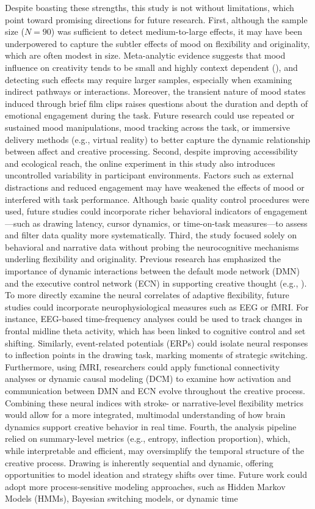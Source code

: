 \documentclass[../MA_Thesis.tex]{subfiles}
\begin{document}
Despite boasting these strengths, this study is not without limitations, which point toward promising directions for future research. First, although the sample size ($N = 90$) was sufficient to detect medium-to-large effects, it may have been underpowered to capture the subtler effects of mood on flexibility and originality, which are often modest in size. Meta-analytic evidence suggests that mood influence on creativity tends to be small and highly context dependent (\cite{baas_meta-analysis_2008}), and detecting such effects may require larger samples, especially when examining indirect pathways or interactions. Moreover, the transient nature of mood states induced through brief film clips raises questions about the duration and depth of emotional engagement during the task. Future research could use repeated or sustained mood manipulations, mood tracking across the task, or immersive delivery methods (e.g., virtual reality) to better capture the dynamic relationship between affect and creative processing. Second, despite improving accessibility and ecological reach, the online experiment in this study also introduces uncontrolled variability in participant environments. Factors such as external distractions and reduced engagement may have weakened the effects of mood or interfered with task performance. Although basic quality control procedures were used, future studies could incorporate richer behavioral indicators of engagement—such as drawing latency, cursor dynamics, or time-on-task measures—to assess and filter data quality more systematically. Third, the study focused solely on behavioral and narrative data without probing the neurocognitive mechanisms underling flexibility and originality. Previous research has emphasized the importance of dynamic interactions between the default mode network (DMN) and the executive control network (ECN) in supporting creative thought (e.g., \cite{beaty_creative_2016}). To more directly examine the neural correlates of adaptive flexibility, future studies could incorporate neurophysiological measures such as EEG or fMRI. For instance, EEG-based time-frequency analyses could be used to track changes in frontal midline theta activity, which has been linked to cognitive control and set shifting. Similarly, event-related potentials (ERPs) could isolate neural responses to inflection points in the drawing task, marking moments of strategic switching. Furthermore, using fMRI, researchers could apply functional connectivity analyses or dynamic causal modeling (DCM) to examine how activation and communication between DMN and ECN evolve throughout the creative process. Combining these neural indices with stroke- or narrative-level flexibility metrics would allow for a more integrated, multimodal understanding of how brain dynamics support creative behavior in real time. Fourth, the analysis pipeline relied on summary-level metrics (e.g., entropy, inflection proportion), which, while interpretable and efficient, may oversimplify the temporal structure of the creative process. Drawing is inherently sequential and dynamic, offering opportunities to model ideation and strategy shifts over time. Future work could adopt more process-sensitive modeling approaches, such as Hidden Markov Models (HMMs), Bayesian switching models, or dynamic time 
\end{document}
